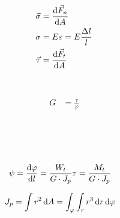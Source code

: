 \begin{boxleft}
\\
\\
\\
\\
\end{boxleft}\begin{boxrightshaded}
\begin{align}
\vec{\sigma}&=\frac{\mathop{}\!\mathrm{d}\vec{F}_n}{\mathop{}\!\mathrm{d} A}\\
\sigma&=E \varepsilon=E\frac{\Delta l}{l}\\
\vec{\tau}&= \frac{\mathop{}\!\mathrm{d}\vec{F}_t}{\mathop{}\!\mathrm{d} A}
\end{align}
\end{boxrightshaded}

\begin{boxleft}
\\
\end{boxleft}\begin{boxrightshaded}
\begin{align}
G&=\frac{\tau}{\varphi}
\end{align}
\end{boxrightshaded}

\begin{boxleft}
\\
\\
\\
\end{boxleft}\begin{boxrightshaded}
\begin{align}
\psi&=\frac{\mathop{}\!\mathrm{d} \varphi}{\mathop{}\!\mathrm{d} l}=\frac{W_t}{G\cdot J_p}\tau=\frac{M_t}{G\cdot J_p}
\end{align}
\end{boxrightshaded}

\begin{boxleft}
\end{boxleft}\begin{boxrightshaded}
\begin{align}
J_p&=\int r^2\mathop{}\!\mathrm{d} A=\int_\varphi\int_r r^3\mathop{}\!\mathrm{d} r \mathop{}\!\mathrm{d} \varphi 
\end{align}
\end{boxrightshaded}

